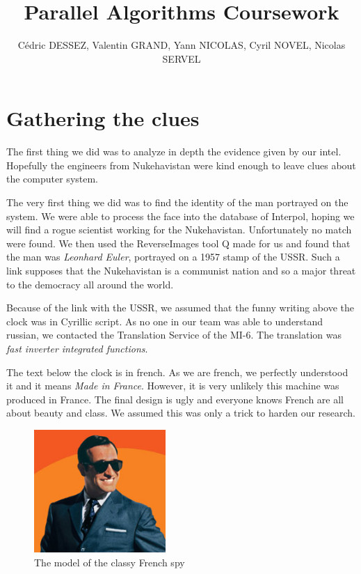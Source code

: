 \documentclass[11pt,a4paper]{article}
\begin{document}
\title{Parallel Algorithms Coursework}
\author{C\'edric DESSEZ, Valentin GRAND, Yann NICOLAS, Cyril NOVEL, Nicolas SERVEL}
\maketitle
\tableofcontents

\newpage

\section{Gathering the clues}
The first thing we did was to analyze in depth the evidence given by our intel. Hopefully the engineers from Nukehavistan were kind enough to leave clues about the computer system.

The very first thing we did was to find the identity of the man portrayed on the system. We were able to process the face into the database of Interpol, hoping we will find a rogue scientist working for the Nukehavistan. Unfortunately no match were found. We then used the ReverseImages tool Q made for us and found that the man was \textit{Leonhard Euler}, portrayed on a 1957 stamp of the USSR. Such a link supposes that the Nukehavistan is a communist nation and so a major threat to the democracy all around the world.

Because of the link with the USSR, we assumed that the funny writing above the clock was in Cyrillic script. As no one in our team was able to understand russian, we contacted the Translation Service of the MI-6. The translation was \textit{fast inverter integrated functions}.

The text below the clock is in french. As we are french, we perfectly understood it and it means \textit{Made in France}. However, it is very unlikely this machine was produced in France. The final design is ugly and everyone knows French are all about beauty and class. We assumed this was only a trick to harden our research.

\begin{figure}[!h]
\centering
\includegraphics[width=5cm]{oss.png}
\caption{The model of the classy French spy}
\label{frenchspy}
\end{figure}
\end{document}
